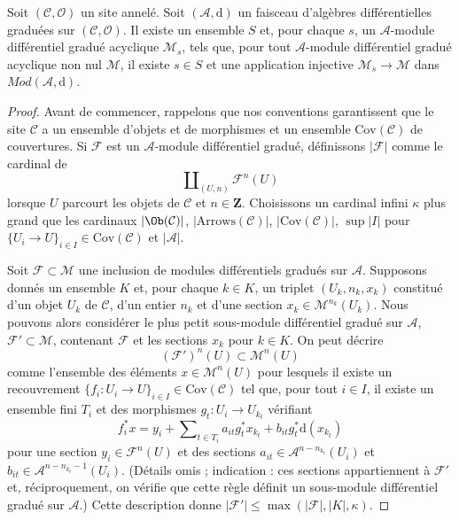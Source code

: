 \begin{lemma}
\label{lemma-small-acyclics}
Soit $(\mathcal{C}, \mathcal{O})$ un site annelé. Soit
$(\mathcal{A}, \text{d})$ un faisceau d'algèbres différentielles graduées sur
$(\mathcal{C}, \mathcal{O})$. Il existe un ensemble $S$ et, pour chaque $s$,
un $\mathcal{A}$-module différentiel gradué acyclique $\mathcal{M}_s$, tels
que, pour tout $\mathcal{A}$-module différentiel gradué acyclique non nul
$\mathcal{M}$, il existe $s \in S$ et une application injective
$\mathcal{M}_s \to \mathcal{M}$ dans $\textit{Mod}(\mathcal{A}, \text{d})$.
\end{lemma}

\begin{proof}
Avant de commencer, rappelons que nos conventions garantissent que le site $\mathcal{C}$
a un ensemble d'objets et de morphismes et un ensemble $\text{Cov}(\mathcal{C})$
de
couvertures. Si $\mathcal{F}$
est un $\mathcal{A}$-module différentiel gradué, définissons $|\mathcal{F}|$
comme le cardinal de
$$
\coprod\nolimits_{(U, n)} \mathcal{F}^n(U)
$$
lorsque $U$ parcourt les objets de $\mathcal{C}$ et $n \in \mathbf{Z}$.
Choisissons un cardinal infini $\kappa$ plus grand
que les cardinaux $|\Ob(\mathcal{C})|$, $|\text{Arrows}(\mathcal{C})|$,
$|\text{Cov}(\mathcal{C})|$, $\sup |I|$
pour $\{U_i \to U\}_{i \in I} \in \text{Cov}(\mathcal{C})$
et $|\mathcal{A}|$.

\medskip\noindent
Soit $\mathcal{F} \subset \mathcal{M}$ une inclusion de modules
différentiels gradués sur $\mathcal{A}$.
Supposons donnés un ensemble $K$ et, pour chaque $k \in K$, un
triplet $(U_k, n_k, x_k)$ constitué d'un objet $U_k$ de $\mathcal{C}$,
d'un entier $n_k$ et d'une section $x_k \in \mathcal{M}^{n_k}(U_k)$.
Nous pouvons alors considérer le plus petit sous-module
différentiel gradué sur $\mathcal{A}$, $\mathcal{F}' \subset \mathcal{M}$,
contenant $\mathcal{F}$ et les sections $x_k$ pour $k \in K$.
On peut
décrire $$
(\mathcal{F}')^n(U) \subset \mathcal{M}^n(U)
$$
comme l'ensemble des éléments $x \in \mathcal{M}^n(U)$ pour lesquels
il existe un recouvrement $\{f_i : U_i \to U\}_{i \in I} \in \text{Cov}(\mathcal{C})$
tel que, pour tout $i \in I$, il existe un ensemble fini $T_i$
et des morphismes $g_t : U_i \to U_{k_t}$
vérifiant $$
f_i^*x
= y_i + \sum\nolimits_{t \in T_i} a_{it}g_t^*x_{k_t} + b_{it}g_t^*\text{d}(x_{k_t})
$$
pour une section $y_i \in \mathcal{F}^n(U)$
et des sections $a_{it} \in \mathcal{A}^{n - n_{k_t}}(U_i)$
et $b_{it} \in \mathcal{A}^{n - n_{k_t} - 1}(U_i)$.
(Détails omis ; indication : ces sections appartiennent à $\mathcal{F}'$
et, réciproquement, on vérifie que cette règle définit
un sous-module différentiel gradué sur $\mathcal{A}$.)
Cette description
donne $|\mathcal{F}'| \leq \max(|\mathcal{F}|, |K|, \kappa)$.


\end{proof}
